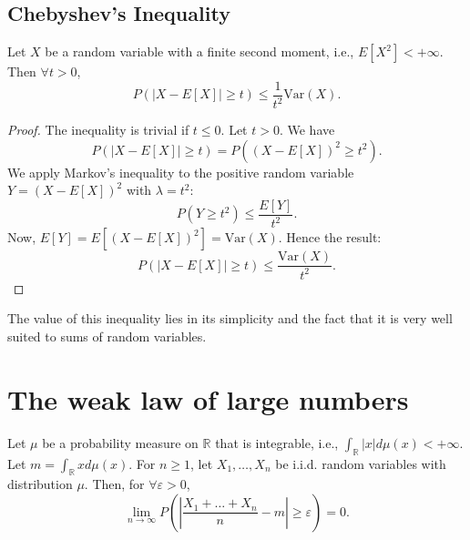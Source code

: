 \subsection{Chebyshev's Inequality}%
\begin{proposition}
Let $X$ be a random variable with a finite second moment, i.e., $E[X^2] < +\infty$. Then $\forall t > 0$,
\[
P(|X - E[X]| \ge t) \le \frac{1}{t^2} \text{Var}(X).
\]
\end{proposition}%
\begin{proof}
The inequality is trivial if $t \le 0$. Let $t>0$. We have
\[
P(|X - E[X]| \ge t) = P((X - E[X])^2 \ge t^2).
\]
We apply Markov's inequality to the positive random variable $Y = (X - E[X])^2$ with $\lambda = t^2$:
\[
P(Y \ge t^2) \le \frac{E[Y]}{t^2}.
\]
Now, $E[Y] = E[(X - E[X])^2] = \text{Var}(X)$. Hence the result:
\[
P(|X - E[X]| \ge t) \le \frac{\text{Var}(X)}{t^2}.
\]
\end{proof}%
The value of this inequality lies in its simplicity and the fact that it is very well suited to sums of random variables.%
\section{The weak law of large numbers}%
\begin{theorem}
Let $\mu$ be a probability measure on $\mathbb{R}$ that is integrable, i.e., $\int_{\mathbb{R}} |x| d\mu(x) < +\infty$.
Let $m = \int_{\mathbb{R}} x d\mu(x)$.
For $n \ge 1$, let $X_1, \dots, X_n$ be i.i.d. random variables with distribution $\mu$. Then, for $\forall \varepsilon > 0$,
\[
\lim_{n \to \infty} P\left(\left|\frac{X_1 + \dots + X_n}{n} - m\right| \ge \varepsilon\right) = 0.
\]
\end{theorem}%

